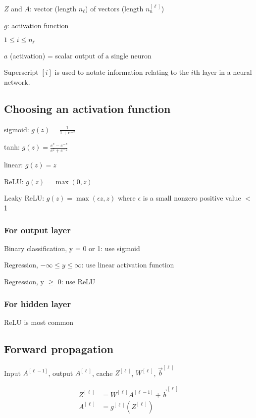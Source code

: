 \documentclass[12pt]{article}
\begin{document}
$Z$ and $A$: vector (length $n_{\ell}$) of vectors (length $n^{[\ell]}_n$)

$g$: activation function

$1 \leq i \leq n_{\ell}$

$a$ (activation) = scalar output of a single neuron

Superscript $[i]$ is used to notate information relating to the $i$th layer in a neural network.

\subsection{Choosing an activation function}

sigmoid: $g(z) = \frac{1}{1 + e^{-z}}$

tanh: $g(z) = \frac{e^z - e^{-z}}{e^z + e^{-z}}$

linear: $g(z) = z$

ReLU: $g(z) = \max(0, z)$

Leaky ReLU: $g(z) = \max(\epsilon z, z)$ where $\epsilon$ is a small nonzero positive value $<$ 1

\subsubsection*{For output layer}

Binary classification, y = 0 or 1: use sigmoid

Regression, $-\infty \leq y \leq \infty$: use linear activation function

Regression, y $\geq$ 0: use ReLU

\subsubsection*{For hidden layer}

ReLU is most common

\subsection{Forward propagation}

Input $A^{[\ell-1]}$, output $A^{[\ell]}$, cache $Z^{[\ell]}$, $W^{[\ell]}$, $\vec{b}^{[\ell]}$

\begin{align*}
    Z^{[\ell]} &= W^{[\ell]} A^{[\ell-1]} + \vec{b}^{[\ell]}\\
    A^{[\ell]} &= g^{[\ell]}(Z^{[\ell]})
\end{align*}
\end{document}
